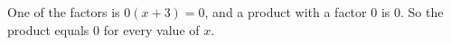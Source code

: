 One of the factors is $0(x+3)=0$, and a product with a factor $0$ is $0$. So the product equals $\boxed{0}$ for every value of $x$.
